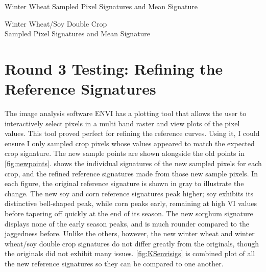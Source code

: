 \begin{ssfigure}
  \centering
  
  \caption{Winter Wheat Sampled Pixel Signatures and Mean Signature}
    \label{fig:KSwheatfirstsigs}
\end{ssfigure}

\begin{ssfigure}
  \centering
  
  \caption[Winter Wheat/Soy Double Crop Sampled Pixel Signatures and Mean Signature]{Winter Wheat/Soy Double Crop\\Sampled Pixel Signatures and Mean Signature}
    \label{fig:KSwheatsoyfirstsigs}
\end{ssfigure}

\clearpage

\section{Round 3 Testing: Refining the Reference Signatures}
\label{appendix:testing:r3}

The image analysis software ENVI \autocite{envi5.0} has a plotting tool that allows the user to interactively select pixels in a multi band raster and view plots of the pixel values. This tool proved perfect for refining the reference curves. Using it, I could ensure I only sampled crop pixels whose values appeared to match the expected crop signature. The new sample points are shown alongside the old points in \autoref{fig:newpoints}.  shows the individual signatures of the new sampled pixels for each crop, and the refined reference signatures made from those new sample pixels. In each figure, the original reference signature is shown in gray to illustrate the change. The new soy and corn reference signatures peak higher; soy exhibits its distinctive bell-shaped peak, while corn peaks early, remaining at high VI values before tapering off quickly at the end of its season. The new sorghum signature displays none of the early season peaks, and is much rounder compared to the jaggedness before. Unlike the others, however, the new winter wheat and winter wheat/soy double crop signatures do not differ greatly from the originals, though the originals did not exhibit many issues. \autoref{fig:KSenvisigs} is combined plot of all the new reference signatures so they can be compared to one another.

